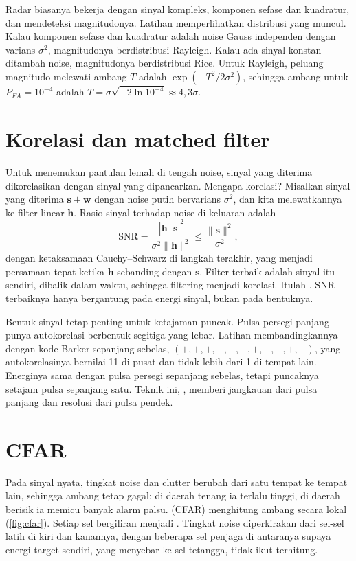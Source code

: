 Radar biasanya bekerja dengan sinyal kompleks, komponen sefase dan kuadratur, dan mendeteksi magnitudonya.
Latihan memperlihatkan distribusi yang muncul. Kalau komponen sefase dan kuadratur adalah noise Gauss
independen dengan varians $\sigma^2$, magnitudonya berdistribusi Rayleigh. Kalau ada sinyal konstan
ditambah noise, magnitudonya berdistribusi Rice. Untuk Rayleigh, peluang magnitudo melewati ambang $T$
adalah $\exp(-T^2/2\sigma^2)$, sehingga ambang untuk $P_{FA}=10^{-4}$ adalah
$T=\sigma\sqrt{-2\ln10^{-4}}\approx4{,}3\sigma$.

\section{Korelasi dan matched filter}

Untuk menemukan pantulan lemah di tengah noise, sinyal yang diterima dikorelasikan dengan sinyal yang
dipancarkan. Mengapa korelasi? Misalkan sinyal yang diterima $\bm s+\bm w$ dengan noise putih bervarians
$\sigma^2$, dan kita melewatkannya ke filter linear $\bm h$. Rasio sinyal terhadap noise di keluaran adalah
\begin{equation}
\mathrm{SNR}=\frac{|\bm h^\top\bm s|^2}{\sigma^2\|\bm h\|^2}\le\frac{\|\bm s\|^2}{\sigma^2},
\end{equation}
dengan ketaksamaan Cauchy--Schwarz di langkah terakhir, yang menjadi persamaan tepat ketika $\bm h$ sebanding
dengan $\bm s$. Filter terbaik adalah sinyal itu sendiri, dibalik dalam waktu, sehingga filtering menjadi
korelasi. Itulah  \citep{richards2014}. SNR terbaiknya hanya bergantung pada energi
sinyal, bukan pada bentuknya.

Bentuk sinyal tetap penting untuk ketajaman puncak. Pulsa persegi panjang punya autokorelasi berbentuk
segitiga yang lebar. Latihan membandingkannya dengan kode Barker sepanjang sebelas,
$(+,+,+,-,-,-,+,-,-,+,-)$, yang autokorelasinya bernilai 11 di pusat dan tidak lebih dari 1 di tempat lain.
Energinya sama dengan pulsa persegi sepanjang sebelas, tetapi puncaknya setajam pulsa sepanjang satu.
Teknik ini, , memberi jangkauan dari pulsa panjang dan resolusi dari pulsa pendek.

\section{CFAR}

Pada sinyal nyata, tingkat noise dan clutter berubah dari satu tempat ke tempat lain, sehingga ambang tetap
gagal: di daerah tenang ia terlalu tinggi, di daerah berisik ia memicu banyak alarm palsu.
 (CFAR) menghitung ambang secara lokal (\cref{fig:cfar}). Setiap sel
bergiliran menjadi . Tingkat noise diperkirakan dari sel-sel latih di kiri dan kanannya,
dengan beberapa sel penjaga di antaranya supaya energi target sendiri, yang menyebar ke sel tetangga, tidak
ikut terhitung.

